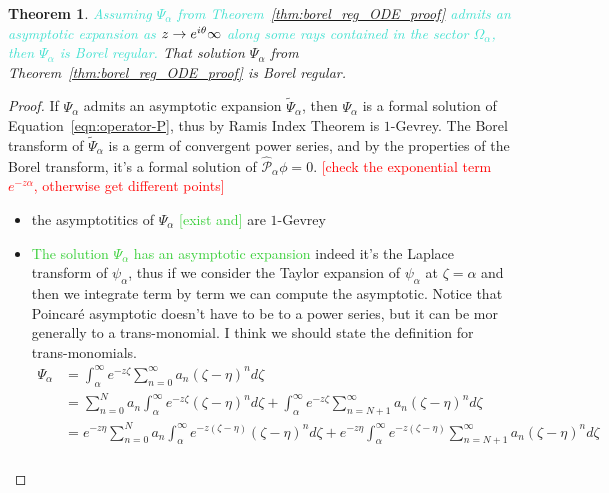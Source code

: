 \documentclass{article}
\let\Re\relax
\DeclareMathOperator{\Re}{Re}
\newcommand{\dualsingexp}[2]{\widehat{\mathcal{H}}L^\infty_{#1, #2}}
\newcommand{\dualsingexpalg}[1]{\dualsingexp{#1}{\bullet}}
\theoremstyle{definition}
\theoremstyle{plain}
\newtheorem{theorem}{Theorem}[section]
\begin{document}
\begin{theorem}
\textcolor{Turquoise}{Assuming $\Psi_\alpha$ from Theorem~\ref{thm:borel_reg_ODE_proof} admits an asymptotic expansion as $\Re z\to e^{i\theta}\infty$ along some rays contained in the sector $\Omega_\alpha$, then $\Psi_\alpha$ is Borel regular.} That solution $\Psi_\alpha$ from Theorem~\ref{thm:borel_reg_ODE_proof} is Borel regular.
\end{theorem}
\begin{proof}
\color{Turquoise}
If $\Psi_\alpha$ admits an asymptotic expansion $\tilde{\Psi}_\alpha$, then $\Psi_\alpha$ is a formal solution of Equation~\eqref{eqn:operator-P}, thus by Ramis Index Theorem is $1$-Gevrey. The Borel transform of $\tilde{\Psi}_\alpha$ is a germ of convergent power series, and by the properties of the Borel transform, it's a formal solution of $\hat{\mathcal{P}}_\alpha \phi=0$. \textcolor{red}{[check the exponential term $e^{-z\alpha}$, otherwise get different points]}
\color{Violet}
    \begin{itemize}
        \item the asymptotitics of $\Psi_\alpha$ \textcolor{LimeGreen}{[exist and]} are $1$-Gevrey
        \item \textcolor{LimeGreen}{The solution $\Psi_\alpha$ has an asymptotic expansion} indeed it's the Laplace transform of $\psi_\alpha$, thus if we consider the Taylor expansion of $\psi_\alpha$ at $\zeta=\alpha$ and then we integrate term by term we can compute the asymptotic. Notice that Poincar\'e asymptotic doesn't have to be to a power series, but it can be mor generally to a trans-monomial. I think we should state the definition for trans-monomials.
        \begin{align}
            \Psi_\alpha&=\int_\alpha^\infty e^{-z\zeta} \sum_{n=0}^\infty a_n (\zeta-\eta)^n d\zeta \\
            & = \sum_{n=0}^N a_n \int_\alpha^\infty e^{-z\zeta}   (\zeta-\eta)^n d\zeta+\int_\alpha^\infty e^{-z\zeta} \sum_{n=N+1}^\infty a_n (\zeta-\eta)^n d\zeta \\
            & = e^{-z\eta} \sum_{n=0}^N a_n \int_\alpha^\infty e^{-z(\zeta - \eta)} (\zeta-\eta)^n d\zeta + e^{-z\eta} \int_\alpha^\infty e^{-z(\zeta - \eta)} \sum_{n=N+1}^\infty a_n (\zeta-\eta)^n d\zeta
        \end{align}
        \begin{multline*}

\end{multline*}
\end{itemize}
\end{proof}
\end{document}
